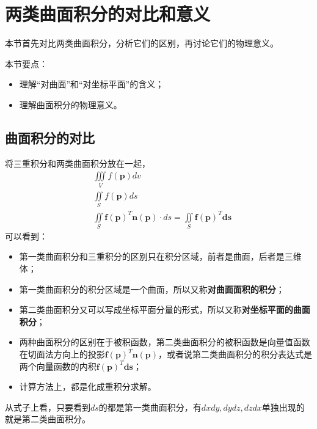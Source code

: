 \section{两类曲面积分的对比和意义}

本节首先对比两类曲面积分，分析它们的区别，再讨论它们的物理意义。

本节要点：
\begin{itemize}
    \item 理解“对曲面”和“对坐标平面”的含义；
    \item 理解曲面积分的物理意义。
\end{itemize}

\subsection{曲面积分的对比}

将三重积分和两类曲面积分放在一起，
\begin{align*}
&\iiint\limits_V{f\left( \boldsymbol{p} \right) dv} \\
&\iint\limits_S{f\left( \boldsymbol{p} \right) ds} \\
&\iint\limits_S{\boldsymbol{f}\left( \boldsymbol{p} \right) ^T\mathbf{n}\left( \boldsymbol{p} \right) \cdot ds}=\iint\limits_S{\boldsymbol{f}\left( \boldsymbol{p} \right) ^T\boldsymbol{ds}}
\end{align*}
可以看到：
\begin{itemize}
    \item 第一类曲面积分和三重积分的区别只在积分区域，前者是曲面，后者是三维体；
    \item 第一类曲面积分的积分区域是一个曲面，所以又称{\bf 对曲面面积的积分}；
    \item 第二类曲面积分又可以写成坐标平面分量的形式，所以又称{\bf 对坐标平面的曲面积分}；
    \item 两种曲面积分的区别在于被积函数，第二类曲面积分的被积函数是向量值函数在切面法方向上的投影$\boldsymbol{f}\left( \boldsymbol{p} \right) ^T\mathbf{n}\left( \boldsymbol{p} \right) $，或者说第二类曲面积分的积分表达式是两个向量函数的内积$\boldsymbol{f}\left( \boldsymbol{p} \right) ^T\boldsymbol{ds}$；
    \item 计算方法上，都是化成重积分求解。
\end{itemize}

\begin{tcolorbox}
从式子上看，只要看到$ds$的都是第一类曲面积分，有$dxdy,dydz,dzdx$单独出现的就是第二类曲面积分。
\end{tcolorbox}


